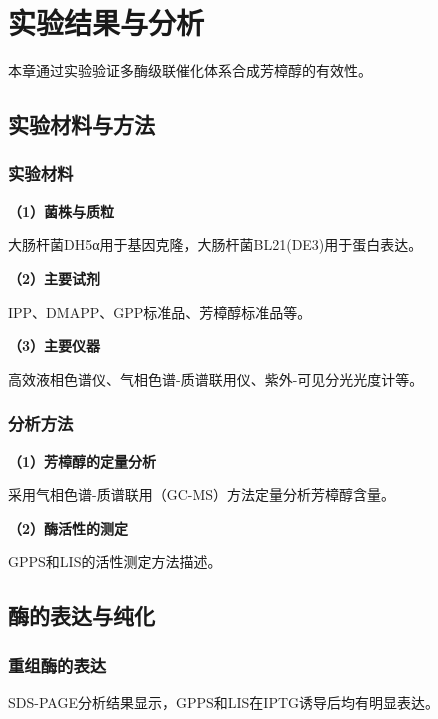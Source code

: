 \section{实验结果与分析}


本章通过实验验证多酶级联催化体系合成芳樟醇的有效性。

\subsection{实验材料与方法}

\subsubsection{实验材料}


\textbf{（1）菌株与质粒}

大肠杆菌DH5α用于基因克隆，大肠杆菌BL21(DE3)用于蛋白表达。

\textbf{（2）主要试剂}

IPP、DMAPP、GPP标准品、芳樟醇标准品等。

\textbf{（3）主要仪器}

高效液相色谱仪、气相色谱-质谱联用仪、紫外-可见分光光度计等。

\subsubsection{分析方法}


\textbf{（1）芳樟醇的定量分析}

采用气相色谱-质谱联用（GC-MS）方法定量分析芳樟醇含量。

\textbf{（2）酶活性的测定}

GPPS和LIS的活性测定方法描述。

\subsection{酶的表达与纯化}

\subsubsection{重组酶的表达}


SDS-PAGE分析结果显示，GPPS和LIS在IPTG诱导后均有明显表达。

